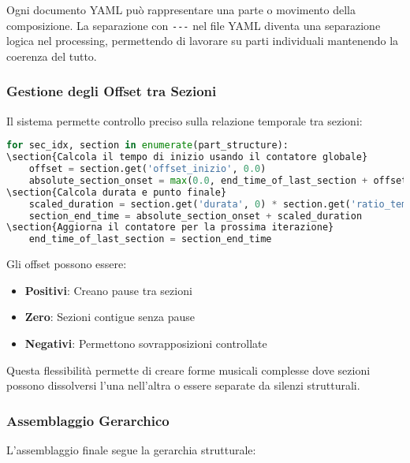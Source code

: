 Ogni documento YAML può rappresentare una parte o movimento della composizione. La separazione con \texttt{{-}{-}{-}} nel file YAML diventa una separazione logica nel processing, permettendo di lavorare su parti individuali mantenendo la coerenza del tutto.
\subsubsection{Gestione degli Offset tra Sezioni}
Il sistema permette controllo preciso sulla relazione temporale tra sezioni:

\begin{lstlisting}[language=Python]
for sec_idx, section in enumerate(part_structure):
\section{Calcola il tempo di inizio usando il contatore globale}
    offset = section.get('offset_inizio', 0.0)
    absolute_section_onset = max(0.0, end_time_of_last_section + offset)
\section{Calcola durata e punto finale}
    scaled_duration = section.get('durata', 0) * section.get('ratio_temporale', 1.0)
    section_end_time = absolute_section_onset + scaled_duration
\section{Aggiorna il contatore per la prossima iterazione}
    end_time_of_last_section = section_end_time
\end{lstlisting}

Gli offset possono essere:
\begin{itemize}
    \item \textbf{Positivi}: Creano pause tra sezioni
    \item \textbf{Zero}: Sezioni contigue senza pause
    \item \textbf{Negativi}: Permettono sovrapposizioni controllate
\end{itemize}

Questa flessibilità permette di creare forme musicali complesse dove sezioni possono dissolversi l'una nell'altra o essere separate da silenzi strutturali.
\subsubsection{Assemblaggio Gerarchico}
L'assemblaggio finale segue la gerarchia strutturale:

